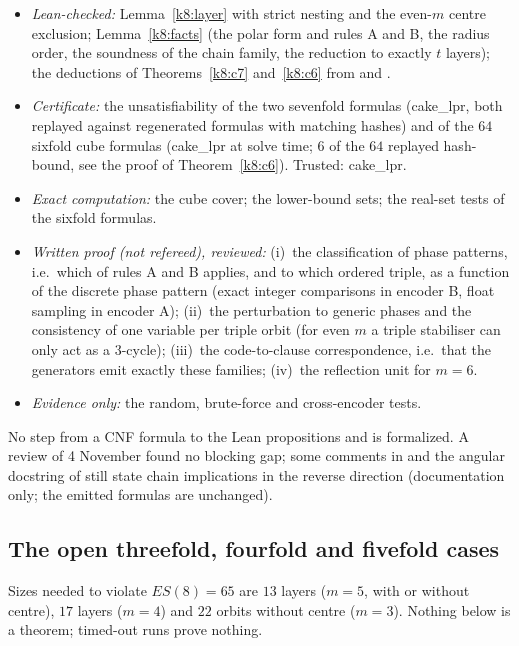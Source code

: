 \begin{itemize}
\item\emph{Lean-checked:} Lemma~\ref{k8:layer} with strict nesting and the even-$m$ centre exclusion;
Lemma~\ref{k8:facts} (the polar form and rules A and B, the radius order, the soundness of the chain family, the
reduction to exactly $t$ layers); the deductions of Theorems~\ref{k8:c7} and~\ref{k8:c6} from  and
.
\item\emph{Certificate:} the unsatisfiability of the two sevenfold formulas (cake\_lpr, both replayed against
regenerated formulas with matching hashes) and of the $64$ sixfold cube formulas (cake\_lpr at solve time; $6$ of the
$64$ replayed hash-bound, see the proof of Theorem~\ref{k8:c6}). Trusted: cake\_lpr.
\item\emph{Exact computation:} the cube cover; the lower-bound sets; the real-set tests of the sixfold formulas.
\item\emph{Written proof (not refereed), reviewed:} (i)~the classification of phase patterns, i.e.\ which of rules A and
B applies, and to which ordered triple, as a function of the discrete phase pattern (exact integer comparisons in
encoder B, float sampling in encoder A); (ii)~the perturbation to generic phases and the consistency of one variable per
triple orbit (for even $m$ a triple stabiliser can only act as a $3$-cycle); (iii)~the code-to-clause correspondence,
i.e.\ that the generators emit exactly these families; (iv)~the reflection unit for $m=6$.
\item\emph{Evidence only:} the random, brute-force and cross-encoder tests.
\end{itemize}
No step from a CNF formula to the Lean propositions  and  is formalized. A review of
4 November found no blocking gap; some comments in  and the angular docstring of
 still state chain implications in the reverse direction (documentation only; the emitted formulas
are unchanged).

\subsection{The open threefold, fourfold and fivefold cases}

Sizes needed to violate $ES(8)=65$ are $13$ layers ($m=5$, with or without centre), $17$ layers ($m=4$) and $22$ orbits
without centre ($m=3$). Nothing below is a theorem; timed-out runs prove nothing.

